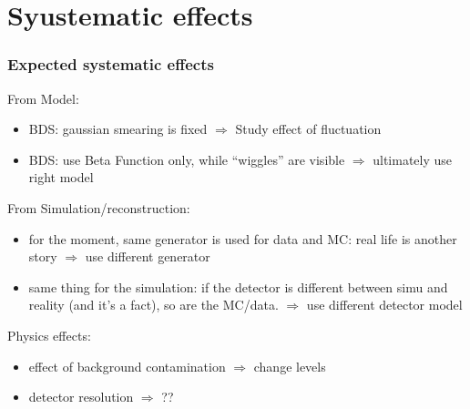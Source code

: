 \documentclass{beamer}
\begin{document}
\section{Syustematic effects}
\begin{frame}
\frametitle{Expected systematic effects}
From Model:
\begin{itemize}
  \item BDS: gaussian smearing is fixed $\Rightarrow$ Study effect of
  fluctuation
  \item BDS: use Beta Function only, while ``wiggles'' are visible $\Rightarrow$
  ultimately use right model
\end{itemize}
\pause
From Simulation/reconstruction:
\begin{itemize}
  \item for the moment, same generator is used for data and MC: real life is
  another story $\Rightarrow$ use different generator
  \item same thing for the simulation: if the detector is different between
  simu and reality (and it's a fact), so are the MC/data. $\Rightarrow$ use
  different detector model
\end{itemize}
\pause
Physics effects:
\begin{itemize}
  \item effect of background contamination $\Rightarrow$ change levels
  \item detector resolution $\Rightarrow$ ??
\end{itemize}
\end{frame}
\end{document}
